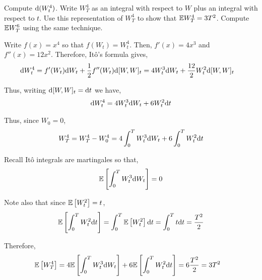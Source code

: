 \documentclass[10pt]{article}
\begin{document}
\maketitle

\begin{problem}[Exercise 8.1]
    Compute \( \mathrm{d}(W_t^4) \). Write \( W_T^4 \) as an integral with respect to \( W \) plus an integral with respect to \( t \). Use this representation of \( W_T^4 \) to show that \( \mathbb{E} W_T^4 = 3T^2 \). Compute \( \mathbb{E} W_T^6 \) using the same technique.
\end{problem}

\begin{solution}[Solution]
Write \( f(x) = x^4 \) so that \( f(W_t) = W_t^4 \). Then, \( f'(x) = 4x^3 \) and \( f''(x) = 12x^2 \). Therefore, It\^o's formula gives,
\begin{align*}
    \mathrm{d} W_t^4 &= f'(W_t)\mathrm{d} W_t + \frac{1}{2}f''(W_t) \mathrm{d}[W,W]_t 
    = 4W_t^3 \mathrm{d} W_t + \frac{12}{2} W_t^2 \mathrm{d}[W,W]_t 
\end{align*}

Thus, writing \( \mathrm{d}[W,W]_t = \mathrm{d} t \) we have,
\begin{align*}
    \mathrm{d} W_t^4 = 4W_t^3 \mathrm{d} W_t + 6W_t^2 \mathrm{d} t
\end{align*}
    
Thus, since \( W_0 = 0 \),
\begin{align*}
    W_T^4 = W_T^4 - W_0^4 = 4\int_{0}^{T} W_t^3\mathrm{d} W_t + 6 \int_{0}^{T}W_t^2 \mathrm{d} t
\end{align*}

Recall It\^o integrals are martingales so that,
\begin{align*}
    \mathbb{E} \left[ \int_{0}^{T}W_t^3\mathrm{d} W_t \right] = 0
\end{align*}

Note also that since \( \mathbb{E} \left[ W_t^2 \right] = t \),
\begin{align*}
    \mathbb{E} \left[ \int_{0}^{T}W_t^2 \mathrm{d} t \right] = \int_{0}^{T}\mathbb{E} \left[ W_t^2 \right]\mathrm{d} t = \int_{0}^{T} t \mathrm{d} t = \dfrac{T^2}{2}
\end{align*}

Therefore,
\begin{align*}
    \mathbb{E} \left[ W_T^4 \right] &= 4\mathbb{E} \left[ \int_{0}^{T}W_t^3 \mathrm{d} W_t \right] + 6 \mathbb{E} \left[ \int_{0}^{T}W_t^2 \mathrm{d} t \right] = 6\dfrac{T^2}{2} = 3 T^2
\end{align*}


\end{solution}
\end{document}
